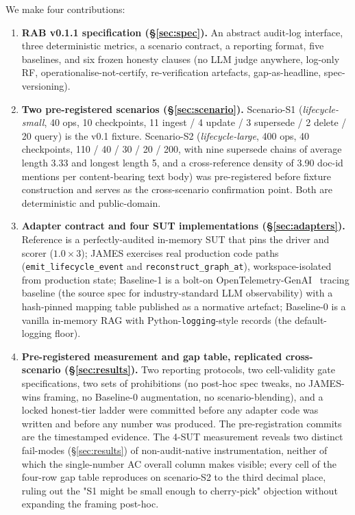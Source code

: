 \documentclass[11pt,a4paper]{article}
\begin{document}
We make four contributions:
\begin{enumerate}[leftmargin=*]
  \item \textbf{RAB v0.1.1 specification (§\ref{sec:spec}).} An abstract audit-log interface, three deterministic metrics, a scenario contract, a reporting format, five baselines, and six frozen honesty clauses (no LLM judge anywhere, log-only RF, operationalise-not-certify, re-verification artefacts, gap-as-headline, spec-versioning).
  \item \textbf{Two pre-registered scenarios (§\ref{sec:scenario}).} Scenario-S1 (\emph{lifecycle-small}, 40 ops, 10 checkpoints, 11 ingest / 4 update / 3 supersede / 2 delete / 20 query) is the v0.1 fixture. Scenario-S2 (\emph{lifecycle-large}, 400 ops, 40 checkpoints, 110 / 40 / 30 / 20 / 200, with nine supersede chains of average length 3.33 and longest length 5, and a cross-reference density of 3.90 doc-id mentions per content-bearing text body) was pre-registered before fixture construction and serves as the cross-scenario confirmation point. Both are deterministic and public-domain.
  \item \textbf{Adapter contract and four SUT implementations (§\ref{sec:adapters}).} Reference is a perfectly-audited in-memory SUT that pins the driver and scorer ($1.0\times 3$); JAMES exercises real production code paths (\texttt{emit\_lifecycle\_event} and \texttt{reconstruct\_graph\_at}), workspace-isolated from production state; Baseline-1 is a bolt-on OpenTelemetry-GenAI~\cite{otel2024genaisemconv} tracing baseline (the source spec for industry-standard LLM observability) with a hash-pinned mapping table published as a normative artefact; Baseline-0 is a vanilla in-memory RAG with Python-\texttt{logging}-style records (the default-logging floor).
  \item \textbf{Pre-registered measurement and gap table, replicated cross-scenario (§\ref{sec:results}).} Two reporting protocols, two cell-validity gate specifications, two sets of prohibitions (no post-hoc spec tweaks, no JAMES-wins framing, no Baseline-0 augmentation, no scenario-blending), and a locked honest-tier ladder were committed before any adapter code was written and before any number was produced. The pre-registration commits are the timestamped evidence. The 4-SUT measurement reveals two distinct fail-modes (§\ref{sec:results}) of non-audit-native instrumentation, neither of which the single-number AC overall column makes visible; every cell of the four-row gap table reproduces on scenario-S2 to the third decimal place, ruling out the "S1 might be small enough to cherry-pick" objection without expanding the framing post-hoc.
\end{enumerate}
\end{document}

